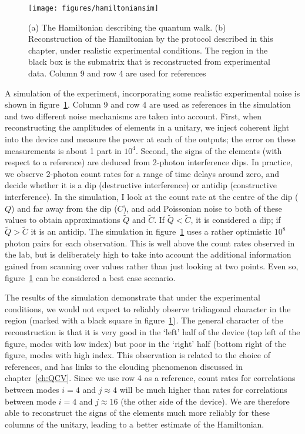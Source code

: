 \begin{figure}
  \centering
  \texttt{[image: figures/hamiltoniansim]}
  \caption[Simulation of the Hamiltonian tomography under experimental noise]
  {(a) The Hamiltonian describing the quantum walk. (b) Reconstruction of 
  the Hamiltonian by the protocol described in this chapter, under realistic
  experimental conditions. The region in the black box is the submatrix that is
  reconstructed from experimental data. Column 9 and row 4 are used for
  references}
  \label{fig:hamiltoniansim}
\end{figure}

A simulation of the experiment, incorporating some realistic experimental noise
is shown in figure~\ref{fig:hamiltoniansim}. Column 9 and row 4 are used as
references in the simulation and two different noise mechanisms are
taken into account. First, when reconstructing the amplitudes of elements in a
unitary, we inject coherent light into the device and measure the power at each
of the outputs; the error on these measurements is about 1 part in \(10^{4}\).
Second, the signs of the elements (with respect to a reference) are deduced from
2-photon interference dips. In practice, we observe 2-photon count rates for a
range of time delays around zero, and decide whether it is a dip (destructive
interference) or antidip (constructive interference). In the simulation, I look
at the count rate at the centre of the dip (\(Q\)) and far away from the dip
(\(C\)), and add Poissonian noise to both of these values to obtain
approximations \(\tilde{Q}\) and \(\tilde{C}\). If \(\tilde{Q}<\tilde{C}\), it
is considered a dip; if \(\tilde{Q}>\tilde{C}\) it is an antidip. The simulation
in figure~\ref{fig:hamiltoniansim} uses a rather optimistic \(10^{8}\) photon
pairs for each observation. This is well above the count rates observed in the
lab, but is deliberately high to take into account the additional information
gained from scanning over values rather than just looking at two points. Even
so, figure~\ref{fig:hamiltoniansim} can be considered a best case scenario.

The results of the simulation demonstrate that under the experimental
conditions, we would not expect to reliably observe tridiagonal character in the
region (marked with a black square in figure~\ref{fig:hamiltoniansim}). The
general character of the reconstruction is that it is very good in the `left'
half of the device (top left of the figure, modes with low index) but poor in
the `right' half (bottom right of the figure, modes with high index. This
observation is related to the choice of references, and has links to the
clouding phenomenon discussed in chapter~\ref{ch:QCV}. Since we use row 4 as a
reference, count rates for correlations between modes \(i=4\) and \(j \approx
4\) will be much higher than rates for correlations between mode \(i=4\) and \(j
\approx 16\) (the other side of the device). We are therefore able to
reconstruct the signs of the elements much more reliably for these columns of
the unitary, leading to a better estimate of the Hamiltonian.

